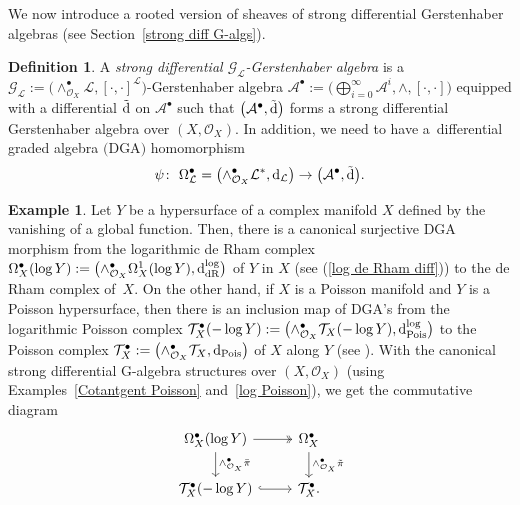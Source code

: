 \documentclass[pdftex]{sigma}
\numberwithin{equation}{section}
\theoremstyle{definition}
\newtheorem{Def}[Thm]{Definition}
\newtheorem{Exm}[Thm]{Example}
\begin{document}
We now introduce a rooted version of sheaves of strong differential Gerstenhaber algebras (see Section~\ref{strong diff G-algs}).
\begin{Def}
	A \emph{strong differential $\mathcal{G}_{\mathcal{L}}$-Ger\-sten\-haber algebra} is a $\mathcal{G}_{\mathcal{L}}:=\bigl(\wedge_{\mathcal{O}_X}^\bullet \mathcal{L}, [\cdot,\cdot]^{\mathcal{L}}\bigr)$-Ger\-sten\-haber algebra $\mathcal{A}^\bullet:=\bigl(\bigoplus^{\infty}_{i=0} \mathcal{A}^i, \wedge, [\cdot, \cdot]\bigr)$ equipped with a differential
	$\tilde{{\rm d}}$ on $\mathcal{A}^\bullet$ such that $\bigl(\mathcal{A}^\bullet, \tilde{{\rm d}}\bigr)$ forms a strong differential Gerstenhaber algebra over $(X, \mathcal{O}_X)$. In addition, we need to have a~differential graded algebra $($DGA$)$ homomorphism
\[
\psi\colon \ \Omega^\bullet_{\mathcal{L}}=\bigl(\wedge_{\mathcal{O}_X}^\bullet \mathcal{L}^*, {\rm d}_{\mathcal{L}}\bigr) \rightarrow \bigl(\mathcal{A}^\bullet,\tilde{{\rm d}}\bigr).
\]		
\end{Def}
\begin{Exm} \label{log Poisson strong diff G-algs}
	Let $Y$ be a hypersurface of a complex manifold $X$ defined by the vanishing of a global function. Then, there is a canonical surjective DGA morphism from the logarithmic de Rham complex $\Omega^{\bullet}_X(\log Y):=\bigl(\wedge^{\bullet}_{\mathcal{O}_X}\Omega^1_X(\log Y), {\rm d}^{\log}_{\rm dR}\bigr)$ of $Y$ in $X$ (see (\ref{log de Rham diff})) to the de Rham complex of~$X$. On the other hand, if $X$ is a Poisson manifold and $Y$ is a Poisson hypersurface, then there is an inclusion map of DGA's from the logarithmic Poisson complex $\mathcal{T}^{\bullet}_X(-\log Y):=\bigl(\wedge^{\bullet}_{\mathcal{O}_X}\mathcal{T}_X(-\log Y), {\rm d}^{\log}_{\rm Pois}\bigr)$ to the Poisson complex $\mathcal{T}^{\bullet}_X:=\bigl(\wedge^{\bullet}_{\mathcal{O}_X}\mathcal{T}_X, {\rm d}_{\rm Pois}\bigr)$ of $X$ along $Y$ (see \cite{JH, BP}).
	With the canonical strong differential G-algebra structures over $(X, \mathcal{O}_X)$ (using Examples~\ref{Cotantgent Poisson} and~\ref{log Poisson}), we get the commutative diagram
\[
		\begin{tikzcd}
			{\Omega^{\bullet}_X(\log Y)}
			\arrow[r, two heads]
			\arrow[d, "{\wedge^{\bullet}_{\mathcal{O}_X}\bar{\pi}}"]
			&
			{\Omega^{\bullet}_X}
			\arrow[d, "{\wedge^{\bullet}_{\mathcal{O}_X}\tilde{\pi}}"]\\
			{\mathcal{T}^{\bullet}_X(-\log Y)}
			\arrow[r, hook]
			&
			{\mathcal{T}^{\bullet}_X}.
		\end{tikzcd}
\]
\end{Exm}
\end{document}
